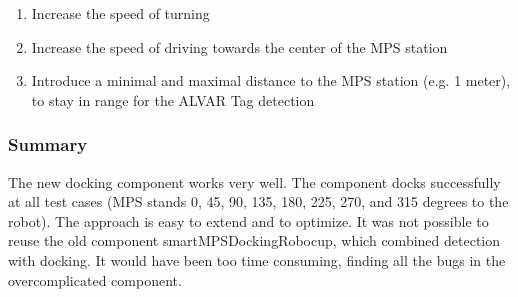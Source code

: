 \begin{enumerate}
\item Increase the speed of turning
\item Increase the speed of driving towards the center of the MPS station
\item Introduce a minimal and maximal distance to the MPS station (e.g. 1 meter), to stay in range for the ALVAR Tag detection
\end{enumerate}
 

\subsubsection{Summary}
The new docking component works very well. The component docks successfully at all test cases (MPS stands 0, 45, 90, 135, 180, 225, 270, and 315 degrees to the robot).
The approach is easy to extend and to optimize. It was not possible to reuse the old component smartMPSDockingRobocup, which combined detection with docking. It would have been too time consuming, finding all the bugs in the overcomplicated component. 
